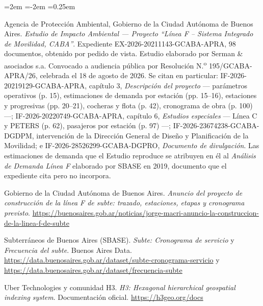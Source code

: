 \documentclass{article}
\begin{document}
\begin{list}{}{\leftmargin=2em \itemindent=-2em \itemsep=0.25em}
\item[] [13] Agencia de Protección Ambiental, Gobierno de la Ciudad Autónoma de Buenos Aires.
  \textit{Estudio de Impacto Ambiental --- Proyecto ``Línea F -- Sistema Integrado de Movilidad, CABA''}.
  Expediente EX-2026-20211143-GCABA-APRA, 98 documentos, obtenido por pedido de vista. Estudio elaborado por
  Serman \& asociados s.a. Convocado a audiencia pública por Resolución N.\textsuperscript{o}
  195/GCABA-APRA/26, celebrada el 18 de agosto de 2026. Se citan en particular: IF-2026-20219129-GCABA-APRA,
  capítulo 3, \textit{Descripción del proyecto} --- parámetros operativos (p. 15), estimaciones de demanda por
  estación (pp. 15--16), estaciones y progresivas (pp. 20--21), cocheras y flota (p. 42), cronograma de obra
  (p. 100) ---; IF-2026-20220749-GCABA-APRA, capítulo 6, \textit{Estudios especiales} --- Línea C y PETERS
  (p. 62), pasajeros por estación (p. 97) ---; IF-2026-23674238-GCABA-DGDPM, intervención de la Dirección
  General de Diseño y Planificación de la Movilidad; e IF-2026-28526299-GCABA-DGPRO, \textit{Documento de
  divulgación}. Las estimaciones de demanda que el Estudio reproduce se atribuyen en él al
  \textit{Análisis de Demanda Línea F} elaborado por SBASE en 2019, documento que el expediente cita pero no
  incorpora.

\item[] [14] Gobierno de la Ciudad Autónoma de Buenos Aires. \textit{Anuncio del proyecto de construcción de
  la línea F de subte: trazado, estaciones, etapas y cronograma previsto}.
  \url{https://buenosaires.gob.ar/noticias/jorge-macri-anuncio-la-construccion-de-la-linea-f-de-subte}

\item[] [15] Subterráneos de Buenos Aires (SBASE). \textit{Subte: Cronograma de servicio} y
  \textit{Frecuencia del subte}. Buenos Aires Data.
  \url{https://data.buenosaires.gob.ar/dataset/subte-cronograma-servicio} y
  \url{https://data.buenosaires.gob.ar/dataset/frecuencia-subte}

\item[] [16] Uber Technologies y comunidad H3. \textit{H3: Hexagonal hierarchical geospatial indexing
  system}. Documentación oficial. \url{https://h3geo.org/docs}


\end{list}
\end{document}
